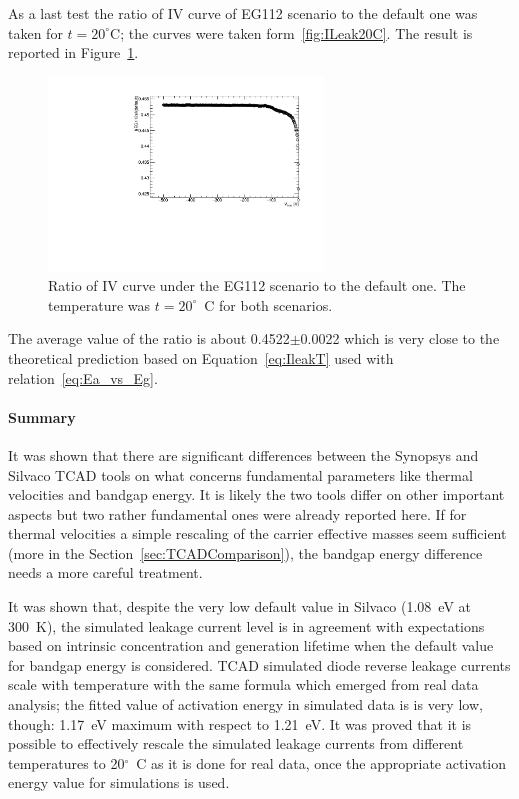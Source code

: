 As  a last test the ratio of IV curve of EG112 scenario to the default one was taken for 
$t=20^{\circ}$C; the curves were taken form~\ref{fig:ILeak20C}. The result is reported in Figure~\ref{fig:EG112_to_default_T_20_Current_ratio}.

\begin{figure}[!htbp]
\centering
\includegraphics[width=0.65\textwidth]{EG112_to_default_T_20_Current_ratio.pdf}
\caption{\label{fig:EG112_to_default_T_20_Current_ratio}Ratio of IV curve under the EG112 
scenario to the default one. The temperature was $t=20^{\circ}$~C for both scenarios.}
\end{figure}

The average value of the ratio is about 0.4522$\pm$0.0022 which is very close to the theoretical 
prediction based on Equation~\ref{eq:IleakT} used with relation~\ref{eq:Ea_vs_Eg}.


\paragraph{Summary}
It was shown that there are significant differences between the Synopsys and Silvaco TCAD tools 
on what concerns fundamental parameters like thermal velocities and bandgap energy. It is likely the 
two tools differ on other important aspects but  two rather fundamental ones were already reported here.
If for  thermal velocities a simple rescaling of the carrier effective masses seem sufficient (more in 
the Section~\ref{sec:TCADComparison}), the bandgap energy difference needs a more careful treatment. 

It was shown that, despite the very low default value in Silvaco (1.08~eV at 300~K), the 
simulated leakage current level is in agreement with expectations based on intrinsic concentration 
and generation lifetime when the default value for bandgap energy is considered. TCAD simulated diode reverse leakage currents scale with temperature 
with the same formula which emerged from real data analysis; the fitted value of activation energy 
in simulated data is is very low, though: 1.17~eV maximum with respect to 1.21~eV. 
It was proved that it is possible to effectively rescale the simulated leakage currents from different temperatures to 20$^{\circ}$~C as it is done for real data, once the appropriate activation energy 
value for simulations is used.

